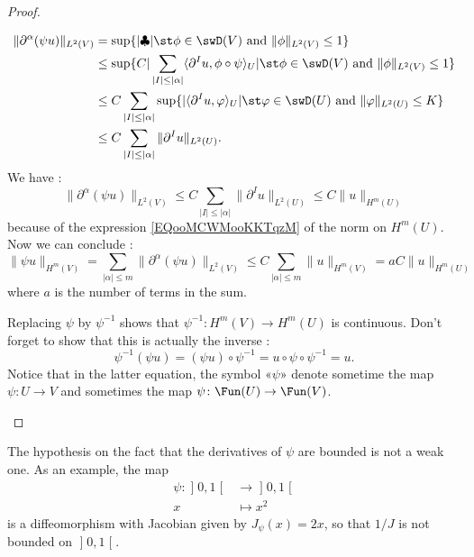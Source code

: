 \begin{proof}
\begin{subproof}
\begin{subequations}
\begin{align}
                    \| \partial^{\alpha}(\psi u) \|_{L^2(V)}&=\sup\{ | \clubsuit |\st \phi\in\swD(V)\text{ and }\| \phi \|_{L^2(V)}\leq 1 \}\\
                    &\leq \sup\{ C|\sum_{| I |\leq | \alpha |}\langle \partial^Iu, \phi\circ\psi\rangle_U|\st \phi\in\swD(V)\text{ and }\| \phi \|_{L^2(V)}\leq 1 \}\\
                    &\leq C\sum_{| I |\leq | \alpha |} \sup\{ |\langle \partial^Iu, \varphi\rangle_U|\st \varphi\in\swD(U)\text{ and }\| \varphi \|_{L^2(U)}\leq K  \}\\
                    &\leq C\sum_{| I |\leq | \alpha |}\| \partial^Iu \|_{L^2(U)}.
                \end{align}
            \end{subequations}
            We have :
            \begin{equation}
                \| \partial^{\alpha}(\psi u) \|_{L^2(V)}\leq C\sum_{| I |\leq | \alpha |}\| \partial^Iu \|_{L^2(U)}\leq C\| u \|_{H^m(U)}
            \end{equation}
            because of the expression \eqref{EQooMCWMooKKTqzM} of the norm on \( H^m(U)\). Now we can conclude :
            \begin{equation}
                \| \psi u \|_{H^m(V)}=\sum_{| \alpha |\leq m}\| \partial^{\alpha}(\psi u) \|_{L^2(V)}\leq C\sum_{| \alpha |\leq m}\| u \|_{H^m(V)} = a C\| u  \|_{H^m(U)}
            \end{equation}
            where \( a\) is the number of terms in the sum.

        \item[\( \psi\colon H^m(U)\to H^m(V)\) is a diffeomorphism]

            Replacing \( \psi\) by \( \psi^{-1}\) shows that \( \psi^{-1}\colon H^m(V)\to H^m(U)\) is continuous. Don't forget to show that this is actually the inverse :
            \begin{equation}
                \psi^{-1}(\psi u)=(\psi u)\circ \psi^{-1}=u\circ\psi\circ\psi^{-1}=u.
            \end{equation}
            Notice that in the latter equation, the symbol «$\psi$» denote sometime the map \( \psi\colon U\to V\) and sometimes the map \( \psi\colon \Fun(U)\to \Fun(V)\).
    \end{subproof}
\end{proof}

\begin{remark}
    The hypothesis on the fact that the derivatives of \( \psi\) are bounded is not a weak one. As an example, the map
    \begin{equation}
        \begin{aligned}
        \psi\colon \mathopen] 0 , 1 \mathclose[&\to \mathopen] 0 , 1 \mathclose[ \\
            x&\mapsto x^2 
        \end{aligned}
    \end{equation}
    is a diffeomorphism with Jacobian given by \( J_{\psi}(x)=2x\), so that \( 1/J\) is not bounded on \( \mathopen] 0 , 1 \mathclose[\).
\end{remark}

